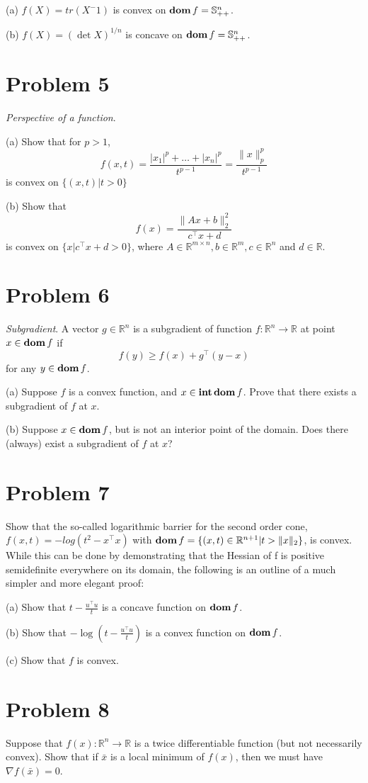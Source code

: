 \documentclass[11pt]{article}
\newcommand{\grad}{\nabla}
\newcommand{\RR}{\mathbb{R}}
\newcommand{\bS}{\mathbb{S}}
\newcommand{\T}{^\top}
\begin{document}
(a) $f(X) = tr(X^-1)$ is convex on $\dom f = \bS^n_{++}$.

(b) $f(X) = (\det X)^{1/n}$ is concave on $\dom f = \bS^n_{++}$.


\clearpage
\section*{Problem 5}
\textit{Perspective of a function}.

(a) Show that for $p>1$,
\[
f(x, t) = \frac{|x_1|^p + \dots + |x_n|^p}{t^{p-1}} = \frac{\|x\|^p_p}{t^{p-1}}
\]
is convex on $\{(x, t)|t>0\}$

(b) Show that
\[
f(x) = \frac{\|Ax+b\|^2_2}{c\T x+d}
\]
is convex on $\{x|c\T x+d > 0\}$, where $A\in \RR^{m\times n}, b\in \RR^m, c\in\RR^n$ and $d\in \RR$.


\clearpage
\section*{Problem 6}
\textit{Subgradient}. A vector $g\in \RR^n$ is a subgradient of function $f:\RR^n \rightarrow \RR$ at point $x\in\mathop{\textbf{dom}} f$ if
\[
f(y) \geq f(x) + g\T (y-x)
\] 
for any $y\in\mathop{\textbf{dom}} f$.

(a) Suppose $f$ is a convex function, and $x\in\mathop{\textbf{int}}\mathop{\textbf{dom}} f$. Prove that there exists a subgradient of $f$ at $x$.

(b) Suppose $x\in\mathop{\textbf{dom}} f$, but is not an interior point of the domain. Does there (always) exist a subgradient of $f$ at $x$?


\clearpage
\section*{Problem 7}
Show that the so-called logarithmic barrier for the second order cone, $f(x, t) = -log(t^2 - x\T x)$ with $\dom f = \{(x,t) \in \RR^{n+1} | t>\|x\|_2\}$, is convex.
While this can be done by demonstrating that the Hessian of f is positive semidefinite everywhere on its domain, the following is an outline of a much simpler and more elegant proof:

(a) Show that $t-\frac{u\T u}{t}$ is a concave function on $\mathop{\textbf{dom}} f$.

(b) Show that $-\log (t - \frac{u\T u}{t})$ is a convex function on $\mathop{\textbf{dom}} f$.

(c) Show that $f$ is convex.


\clearpage
\section*{Problem 8}
Suppose that $f(x): \RR^n \rightarrow \RR$ is a twice differentiable function (but not necessarily convex). Show that if $\bar x$ is a local minimum of $f(x)$, then we must have $\grad f(\bar x) = 0$.
\end{document}
